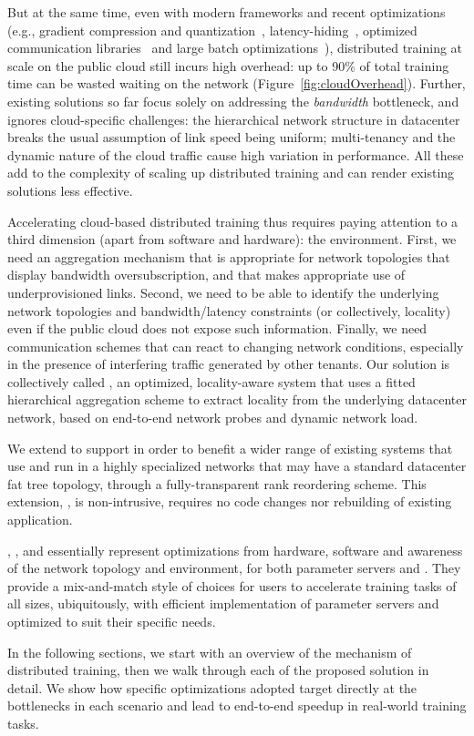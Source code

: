 But at the same time, even with modern frameworks and recent optimizations 
(e.g., gradient compression and quantization~\cite{lin2017deep, cntk1bt, lim20183lc}, latency-hiding~\cite{poseidon, jayarajan2019priority,hashemi2018tictac}, optimized communication libraries~\cite{facebook35:online, Operatio73:online, dmlcpsli50:online} and large batch optimizations~\cite{ImageNetIn1Hour}), distributed training at scale on the public cloud still incurs high overhead: up to 90\% of total training time can be wasted waiting on the network (Figure~\ref{fig:cloudOverhead}). Further, existing solutions so far focus solely on addressing the \textit{bandwidth} bottleneck, and ignores cloud-specific challenges: the hierarchical network structure in datacenter breaks the usual assumption of link speed being uniform; multi-tenancy and the dynamic nature of the cloud traffic cause high variation in performance. All these add to the complexity of scaling up distributed training and can render existing solutions less effective. 

Accelerating cloud-based distributed training thus requires paying attention to a third dimension (apart from software and hardware): the environment. First, we need an aggregation mechanism that is appropriate for network topologies that display bandwidth oversubscription, and that makes appropriate use of underprovisioned links.  Second, we need to be able to identify the underlying network topologies and bandwidth/latency constraints (or collectively, locality) even if the public cloud does not expose such information.  Finally, we need communication schemes that can react to changing network conditions, especially in the presence of interfering traffic generated by other tenants. Our solution is collectively called \plink, an optimized, locality-aware system that uses a fitted hierarchical aggregation scheme to extract locality from the underlying datacenter network, based on end-to-end network probes and dynamic network load. 

We extend \plink to support \collectives in order to benefit a wider range of existing systems that use \collectives and run in a highly specialized networks that may have a standard datacenter fat tree topology, through a fully-transparent rank reordering scheme. This extension, \cmpi, is non-intrusive, requires no code changes nor rebuilding of existing application.

\pbox, \phub, \plink and \cmpi essentially represent optimizations from hardware, software and awareness of the network topology and environment, for both parameter servers and \collectives. They provide a mix-and-match style of choices for users to accelerate training tasks of all sizes, ubiquitously, with efficient implementation of parameter servers and optimized \collectives to suit their specific needs. 

In the following sections, we start with an overview of the mechanism of distributed training, then we walk through each of the proposed solution in detail. We show how specific optimizations adopted target directly at the bottlenecks in each scenario and lead to end-to-end speedup in real-world training tasks.